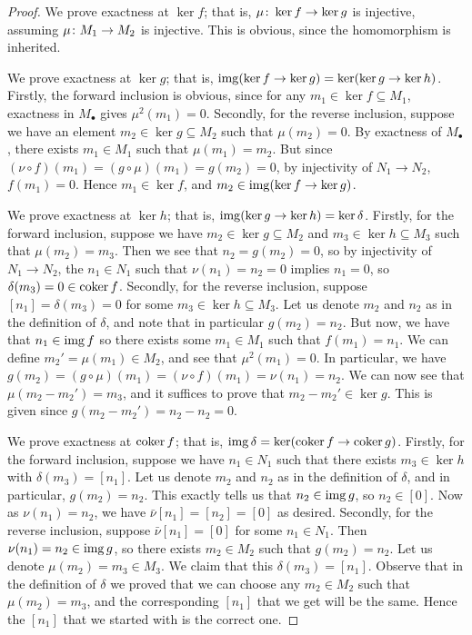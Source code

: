 \begin{proof}
    We prove exactness at \(\ker f\);
    that is, \(\mu\colon\ker f\to\ker g\) is injective,
    assuming \(\mu\colon M_1\to M_2\) is injective.
    This is obvious, since the homomorphism is inherited.

    We prove exactness at \(\ker g\);
    that is, \(\operatorname{img}(\ker f \to \ker g) = \ker(\ker g \to \ker h)\).
    Firstly, the forward inclusion is obvious,
    since for any \(m_1 \in \ker f \subseteq M_1\),
    exactness in \(M_\bullet\) gives \(\mu^2(m_1) = 0\).
    Secondly, for the reverse inclusion,
    suppose we have an element \(m_2 \in \ker g \subseteq M_2\) such that \(\mu(m_2) = 0\).
    By exactness of \(M_\bullet\), there exists \(m_1 \in M_1\) such that \(\mu(m_1) = m_2\).
    But since \((\nu\circ f)(m_1) = (g\circ\mu)(m_1) = g(m_2) = 0\),
    by injectivity of \(N_1 \to N_2\), \(f(m_1) = 0\).
    Hence \(m_1 \in \ker f\), and \(m_2 \in \operatorname{img}(\ker f \to \ker g)\).

    We prove exactness at \(\ker h\);
    that is, \(\operatorname{img}(\ker g \to \ker h) = \ker\delta\).
    Firstly, for the forward inclusion,
    suppose we have \(m_2 \in \ker g \subseteq M_2\) and \(m_3 \in \ker h \subseteq M_3\)
    such that \(\mu(m_2) = m_3\).
    Then we see that \(n_2 = g(m_2) = 0\),
    so by injectivity of \(N_1 \to N_2\),
    the \(n_1 \in N_1\) such that \(\nu(n_1) = n_2 = 0\) implies \(n_1 = 0\),
    so \(\delta(m_3) = 0 \in \operatorname{coker} f\).
    Secondly, for the reverse inclusion,
    suppose \([n_1] = \delta(m_3) = 0\) for some \(m_3 \in \ker h \subseteq M_3\).
    Let us denote \(m_2\) and \(n_2\) as in the definition of \(\delta\),
    and note that in particular \(g(m_2) = n_2\).
    But now, we have that \(n_1 \in \operatorname{img} f\) so there exists some \(m_1 \in M_1\)
    such that \(f(m_1) = n_1\).
    We can define \(m_2' = \mu(m_1) \in M_2\), and see that \(\mu^2(m_1) = 0\).
    In particular, we have \(g(m_2) = (g\circ\mu)(m_1) = (\nu\circ f)(m_1) = \nu(n_1) = n_2\).
    We can now see that \(\mu(m_2-m_2') = m_3\),
    and it suffices to prove that \(m_2-m_2' \in \ker g\).
    This is given since \(g(m_2-m_2') = n_2 - n_2 = 0\).
    
    We prove exactness at \(\operatorname{coker} f\);
    that is, \(\operatorname{img}\delta = \ker(\operatorname{coker} f \to \operatorname{coker} g)\).
    Firstly, for the forward inclusion,
    suppose we have \(n_1 \in N_1\)
    such that there exists \(m_3 \in \ker h\) with \(\delta(m_3) = [n_1]\).
    Let us denote \(m_2\) and \(n_2\) as in the definition of \(\delta\),
    and in particular, \(g(m_2) = n_2\).
    This exactly tells us that \(n_2 \in \operatorname{img} g\),
    so \(n_2 \in [0]\).
    Now as \(\nu(n_1) = n_2\), we have \(\bar{\nu}[n_1] = [n_2] = [0]\) as desired.
    Secondly, for the reverse inclusion,
    suppose \(\bar{\nu}[n_1] = [0]\) for some \(n_1 \in N_1\).
    Then \(\nu(n_1) = n_2 \in \operatorname{img} g\),
    so there exists \(m_2 \in M_2\) such that \(g(m_2) = n_2\).
    Let us denote \(\mu(m_2) = m_3 \in M_3\).
    We claim that this \(\delta(m_3) = [n_1]\).
    Observe that in the definition of \(\delta\) we proved that
    we can choose any \(m_2 \in M_2\) such that \(\mu(m_2) = m_3\),
    and the corresponding \([n_1]\) that we get will be the same.
    Hence the \([n_1]\) that we started with is the correct one.


\end{proof}
